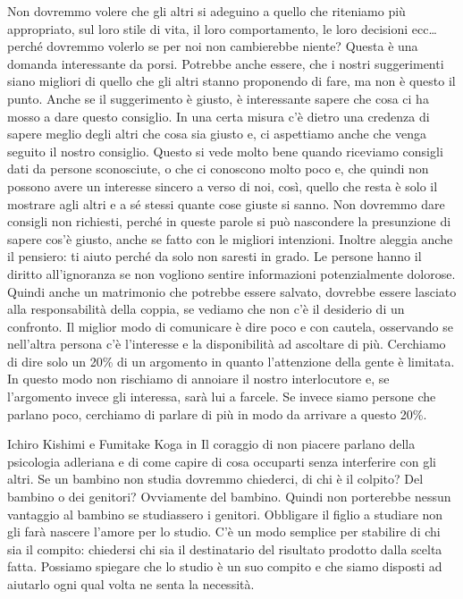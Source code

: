 \documentclass[12pt]{book} %
\begin{document}
Non dovremmo volere che gli altri si adeguino a quello che
riteniamo più appropriato, sul loro stile di vita, il loro comportamento, le loro decisioni ecc… perché dovremmo
volerlo se per noi non cambierebbe niente? Questa è una domanda interessante da porsi. Potrebbe anche essere, che i
nostri suggerimenti siano migliori di quello che gli altri stanno proponendo di fare, ma non è questo il punto. Anche
se il suggerimento è giusto, è interessante sapere che cosa ci ha mosso a dare questo consiglio. In una certa misura
c'è dietro una credenza di sapere meglio degli altri che cosa sia giusto e, ci aspettiamo anche
che venga seguito il nostro consiglio. Questo si vede molto bene quando riceviamo consigli dati da persone sconosciute, 
o che ci conoscono molto poco e, che quindi non possono avere un
interesse sincero a verso di noi, così, quello che resta è solo il mostrare agli altri e a sé stessi quante cose
giuste si sanno. Non dovremmo dare consigli non richiesti, perché in queste parole si può nascondere la presunzione di
sapere cos'è giusto, anche se fatto con le migliori intenzioni. Inoltre aleggia anche il pensiero:
ti aiuto perché da solo non saresti in grado.
Le persone hanno il diritto all'ignoranza se non vogliono sentire informazioni potenzialmente
dolorose. Quindi anche un matrimonio che potrebbe essere salvato, dovrebbe essere lasciato alla responsabilità della
coppia, se vediamo che non c'è il desiderio di un confronto. Il miglior modo di comunicare è dire
poco e con cautela, osservando se nell'altra persona c'è l'interesse e la disponibilità ad ascoltare di più.
Cerchiamo di dire solo un 20\% di un argomento in quanto l'attenzione della gente è limitata. In questo modo non rischiamo di annoiare il nostro interlocutore e, se l'argomento invece gli interessa, sarà lui a farcele. Se invece siamo persone che parlano poco, cerchiamo di parlare di più in modo da arrivare a questo 20\%.

Ichiro Kishimi e Fumitake Koga in Il coraggio di non piacere parlano
della psicologia adleriana e di come capire di cosa occuparti senza interferire con gli altri. Se un bambino non studia
dovremmo chiederci, di chi è il colpito? Del bambino o dei genitori? Ovviamente del bambino. Quindi non porterebbe
nessun vantaggio al bambino se studiassero i genitori. Obbligare il figlio a studiare non gli farà nascere l'amore per
lo studio. C'è un modo semplice per stabilire di chi sia il compito: chiedersi chi sia il
destinatario del risultato prodotto dalla scelta fatta. Possiamo spiegare che lo studio è un suo compito e che siamo
disposti ad aiutarlo ogni qual volta ne senta la necessità.
\end{document}

